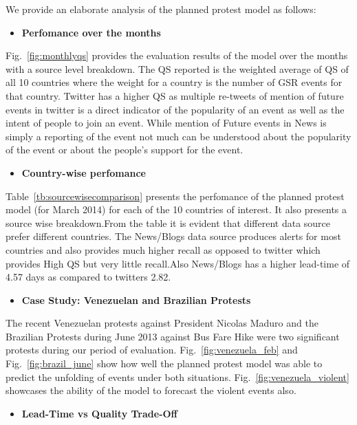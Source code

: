 We provide an elaborate analysis of the planned protest model as follows:
\begin{itemize}
    \item {\bf Perfomance over the months}
\end{itemize}
    Fig.~\ref{fig:monthlyqs} provides the evaluation results of the model over the months with a source level breakdown. The QS reported is the weighted average of QS of all 10 countries where the weight for a country is the number of GSR events for that country.
    Twitter has a higher QS as multiple re-tweets of mention of future events in twitter is a direct indicator of the popularity of an event as well as the intent of people to join an event. While mention of Future events in News is simply a reporting of the event not much can be understood about the popularity of the event or about the people's support for the event. 
\begin{itemize}
    \item {\bf Country-wise perfomance}
\end{itemize}
    Table~\ref{tb:sourcewisecomparison} presents the perfomance of the planned protest model (for March 2014) for each of the 10 countries of interest. It also presents a source wise breakdown.From the table it is evident that different data source prefer different countries. The News/Blogs data source produces alerts for most countries and also provides much higher recall as opposed to twitter which provides High QS but very little recall.Also News/Blogs has a higher lead-time of 4.57 days as compared to twitters 2.82.

\begin{itemize}
    \item {\bf Case Study: Venezuelan and Brazilian Protests}
\end{itemize}
The recent Venezuelan protests against President Nicolas Maduro and the Brazilian Protests during June 2013 against Bus Fare Hike were two significant protests during our period of evaluation. Fig.~\ref{fig:venezuela_feb} and Fig.~\ref{fig:brazil_june} show how well the planned protest model was able to predict the unfolding of events under both situations. Fig.~\ref{fig:venezuela_violent} showcases the ability of the model to forecast the violent events also.

\begin{itemize}
    \item {\bf Lead-Time vs Quality Trade-Off}
\end{itemize}

